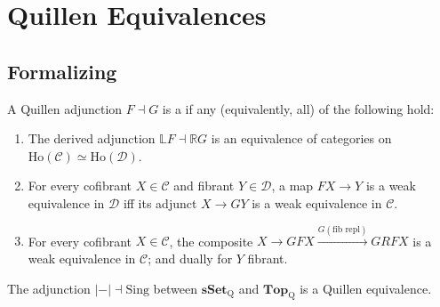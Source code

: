 \section{Quillen Equivalences}
\label{sec:quillen-equivalences}

\subsection{Formalizing}

\begin{definition}
\label{def:quillen-eqv}
A Quillen adjunction $F \dashv G$ is a  if any
(equivalently, all) of the following hold:
\begin{enumerate}
  \item The derived adjunction $\mathbb{L} F \dashv \mathbb{R} G$ is an
        equivalence of categories on $\mathrm{Ho}(\mathcal{C}) \simeq
        \mathrm{Ho}(\mathcal{D})$.
  \item For every cofibrant $X \in \mathcal{C}$ and fibrant $Y \in
        \mathcal{D}$, a map $F X \to Y$ is a weak equivalence in
        $\mathcal{D}$ iff its adjunct $X \to G Y$ is a weak equivalence
        in $\mathcal{C}$.
  \item For every cofibrant $X \in \mathcal{C}$, the composite
        $X \to G F X \xrightarrow{G(\text{fib repl})} G R F X$
        is a weak equivalence in $\mathcal{C}$; and dually for $Y$ fibrant.
\end{enumerate}
\end{definition}

\begin{theorem}
\label{thm:real-sing-qeq}
The adjunction $\lvert{-}\rvert \dashv \mathrm{Sing}$ between
$\mathbf{sSet}_{\mathrm{Q}}$ and $\mathbf{Top}_{\mathrm{Q}}$ is a Quillen
equivalence.
\end{theorem}

